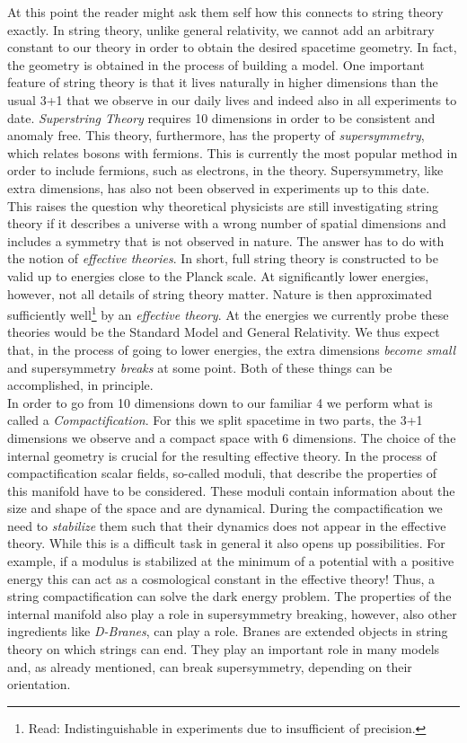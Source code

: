 \documentclass[a4paper,12pt]{report}
\begin{document}
At this point the reader might ask them self how this connects to string theory exactly. In string theory, unlike general relativity, we cannot add an arbitrary constant to our theory in order to obtain the desired spacetime geometry. In fact, the geometry is obtained in the process of building a model. One important feature of string theory is that it lives naturally in higher dimensions than the usual 3+1 that we observe in our daily lives and indeed also in all experiments to date. \emph{Superstring Theory} requires 10 dimensions in order to be consistent and anomaly free. This theory, furthermore, has the property of \emph{supersymmetry}, which relates bosons with fermions. This is currently the most popular method in order to include fermions, such as electrons, in the theory. Supersymmetry, like extra dimensions, has also not been observed in experiments up to this date.\\
This raises the question why theoretical physicists are still investigating string theory if it describes a universe with a wrong number of spatial dimensions and includes a symmetry that is not observed in nature. The answer has to do with the notion of \emph{effective theories}. In short, full string theory is constructed to be valid up to energies close to the Planck scale. At significantly lower energies, however, not all details of string theory matter. Nature is then approximated sufficiently well\footnote{Read: Indistinguishable in experiments due to insufficient of precision.} by an \emph{effective theory}. At the energies we currently probe these theories would be the Standard Model and General Relativity. We thus expect that, in the process of going to lower energies, the extra dimensions \emph{become small} and supersymmetry \emph{breaks} at some point. Both of these things can be accomplished, in principle.\\
In order to go from 10 dimensions down to our familiar 4 we perform what is called a \emph{Compactification}. For this we split spacetime in two parts, the 3+1 dimensions we observe and a compact space with 6 dimensions. The choice of the internal geometry is crucial for the resulting effective theory. In the process of compactification scalar fields, so-called moduli, that describe the properties of this manifold have to be considered. These moduli contain information about the size and shape of the space and are dynamical. During the compactification we need to \emph{stabilize} them such that their dynamics does not appear in the effective theory. While this is a difficult task in general it also opens up possibilities. For example, if a modulus is stabilized at the minimum of a potential with a positive energy this can act as a cosmological constant in the effective theory! Thus, a string compactification can solve the dark energy problem. The properties of the internal manifold also play a role in supersymmetry breaking, however, also other ingredients like \emph{D-Branes}, can play a role. Branes are extended objects in string theory on which strings can end. They play an important role in many models and, as already mentioned, can break supersymmetry, depending on their orientation.\\
\end{document}
